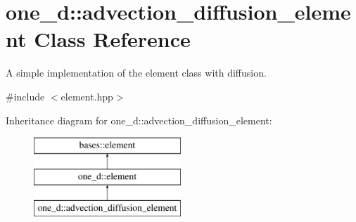 \hypertarget{classone__d_1_1advection__diffusion__element}{\section{one\-\_\-d\-:\-:advection\-\_\-diffusion\-\_\-element Class Reference}
\label{classone__d_1_1advection__diffusion__element}
}


A simple implementation of the element class with diffusion.  




{\ttfamily \#include $<$element.\-hpp$>$}

Inheritance diagram for one\-\_\-d\-:\-:advection\-\_\-diffusion\-\_\-element\-:\begin{figure}[H]
\begin{center}
\leavevmode
\includegraphics[height=3.000000cm]{classone__d_1_1advection__diffusion__element}
\end{center}
\end{figure}
